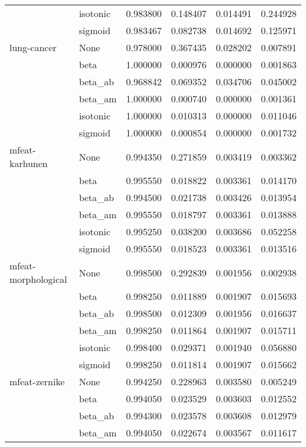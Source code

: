 \begin{tabular}{llrrrr}
        & isotonic &  0.983800 &  0.148407 &  0.014491 &  0.244928 \\
        & sigmoid &  0.983467 &  0.082738 &  0.014692 &  0.125971 \\
lung-cancer & None &  0.978000 &  0.367435 &  0.028202 &  0.007891 \\
        & beta &  1.000000 &  0.000976 &  0.000000 &  0.001863 \\
        & beta\_ab &  0.968842 &  0.069352 &  0.034706 &  0.045002 \\
        & beta\_am &  1.000000 &  0.000740 &  0.000000 &  0.001361 \\
        & isotonic &  1.000000 &  0.010313 &  0.000000 &  0.011046 \\
        & sigmoid &  1.000000 &  0.000854 &  0.000000 &  0.001732 \\
mfeat-karhunen & None &  0.994350 &  0.271859 &  0.003419 &  0.003362 \\
        & beta &  0.995550 &  0.018822 &  0.003361 &  0.014170 \\
        & beta\_ab &  0.994500 &  0.021738 &  0.003426 &  0.013954 \\
        & beta\_am &  0.995550 &  0.018797 &  0.003361 &  0.013888 \\
        & isotonic &  0.995250 &  0.038200 &  0.003686 &  0.052258 \\
        & sigmoid &  0.995550 &  0.018523 &  0.003361 &  0.013516 \\
mfeat-morphological & None &  0.998500 &  0.292839 &  0.001956 &  0.002938 \\
        & beta &  0.998250 &  0.011889 &  0.001907 &  0.015693 \\
        & beta\_ab &  0.998500 &  0.012309 &  0.001956 &  0.016637 \\
        & beta\_am &  0.998250 &  0.011864 &  0.001907 &  0.015711 \\
        & isotonic &  0.998400 &  0.029371 &  0.001940 &  0.056880 \\
        & sigmoid &  0.998250 &  0.011814 &  0.001907 &  0.015662 \\
mfeat-zernike & None &  0.994250 &  0.228963 &  0.003580 &  0.005249 \\
        & beta &  0.994050 &  0.023529 &  0.003603 &  0.012552 \\
        & beta\_ab &  0.994300 &  0.023578 &  0.003608 &  0.012979 \\
        & beta\_am &  0.994050 &  0.022674 &  0.003567 &  0.011617 \\

\end{tabular}
